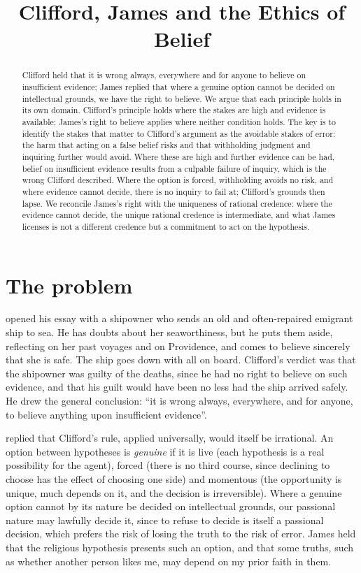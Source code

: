 \documentclass{situationist-preprint}
\title{Clifford, James and the Ethics of Belief}
\begin{document}
\maketitle

\begin{abstract}
Clifford held that it is wrong always, everywhere and for anyone to believe on insufficient evidence; James replied that where a genuine option cannot be decided on intellectual grounds, we have the right to believe. We argue that each principle holds in its own domain. Clifford's principle holds where the stakes are high and evidence is available; James's right to believe applies where neither condition holds. The key is to identify the stakes that matter to Clifford's argument as the avoidable stakes of error: the harm that acting on a false belief risks and that withholding judgment and inquiring further would avoid. Where these are high and further evidence can be had, belief on insufficient evidence results from a culpable failure of inquiry, which is the wrong Clifford described. Where the option is forced, withholding avoids no risk, and where evidence cannot decide, there is no inquiry to fail at; Clifford's grounds then lapse. We reconcile James's right with the uniqueness of rational credence: where the evidence cannot decide, the unique rational credence is intermediate, and what James licenses is not a different credence but a commitment to act on the hypothesis.
\end{abstract}

\section{The problem}

\citet{Clifford1877} opened his essay with a shipowner who sends an old and often-repaired emigrant ship to sea. He has doubts about her seaworthiness, but he puts them aside, reflecting on her past voyages and on Providence, and comes to believe sincerely that she is safe. The ship goes down with all on board. Clifford's verdict was that the shipowner was guilty of the deaths, since he had no right to believe on such evidence, and that his guilt would have been no less had the ship arrived safely. He drew the general conclusion: \enquote{it is wrong always, everywhere, and for anyone, to believe anything upon insufficient evidence}.

\citet{James1896} replied that Clifford's rule, applied universally, would itself be irrational. An option between hypotheses is \emph{genuine} if it is live (each hypothesis is a real possibility for the agent), forced (there is no third course, since declining to choose has the effect of choosing one side) and momentous (the opportunity is unique, much depends on it, and the decision is irreversible). Where a genuine option cannot by its nature be decided on intellectual grounds, our passional nature may lawfully decide it, since to refuse to decide is itself a passional decision, which prefers the risk of losing the truth to the risk of error. James held that the religious hypothesis presents such an option, and that some truths, such as whether another person likes me, may depend on my prior faith in them.
\end{document}
